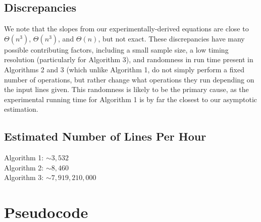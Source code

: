 \documentclass{article}
\begin{document}
\subsection*{Discrepancies}
We note that the slopes from our experimentally-derived equations are close to $\Theta(n^3)$, $\Theta(n^3)$, and $\Theta(n)$, but not exact.  These discrepancies have many possible contributing factors, including a small sample size, a low timing resolution (particularly for Algorithm 3), and randomness in run time present in Algorithms 2 and 3 (which unlike Algorithm 1, do not simply perform a fixed number of operations, but rather change what operations they run depending on the input lines given.  This randomness is likely to be the primary cause, as the experimental running time for Algorithm 1 is by far the closest to our asymptotic estimation.

\subsection*{Estimated Number of Lines Per Hour}
Algorithm 1: $\sim 3,532$\\
Algorithm 2: $\sim 8,460$\\
Algorithm 3: $\sim 7,919,210,000$

\pagebreak

\section*{Pseudocode}

\end{document}
